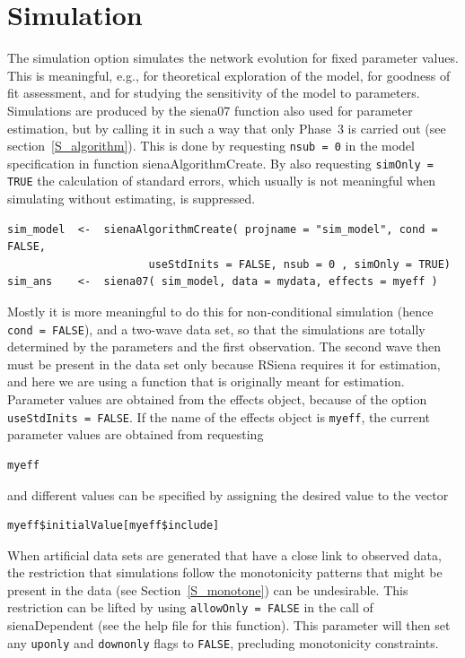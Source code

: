 \documentclass[a4paper,fleqn,11pt]{article}
\newcommand{\+}{\, + \,}
\newcommand{\sfn}[1]{\textsf{#1}}
\newcommand{\RS}{{\sf RSiena }}
\begin{document}
\newpage
\section{Simulation}
\label{S_sim}

The simulation option simulates the network evolution for fixed
parameter values. This is meaningful, e.g., for theoretical
exploration of the model, for goodness of fit assessment,
and for studying the sensitivity of the model to parameters.
Simulations are produced by the \textsf{siena07} function
also used for parameter estimation, but by calling it in
such a way that only Phase~3 is carried out
(see section~\ref{S_algorithm}).
This is done by requesting \texttt{nsub = 0} in
the model specification in function \textsf{sienaAlgorithmCreate}.
By also requesting \texttt{simOnly = TRUE} the calculation
of standard errors, which usually is not meaningful when
simulating without estimating, is suppressed.
\begin{verbatim}
sim_model  <-  sienaAlgorithmCreate( projname = "sim_model", cond = FALSE,
                      useStdInits = FALSE, nsub = 0 , simOnly = TRUE)
sim_ans    <-  siena07( sim_model, data = mydata, effects = myeff )
\end{verbatim}
Mostly it is more meaningful to do this for non-conditional simulation
(hence \texttt{cond = FALSE}), and a two-wave data set,
so that the simulations are totally determined
by the parameters and the first observation.
The second wave then must be present in the data set only
because \RS requires it for estimation,
and here we are using a function that is originally
meant for estimation.
Parameter values are obtained from the effects object,
because of the option \texttt{useStdInits = FALSE}.
If the name of the effects object is \texttt{myeff},
the current parameter values are obtained from requesting
\begin{verbatim}
myeff
\end{verbatim}
and different values can be specified by assigning the
desired value to the vector
\begin{verbatim}
myeff$initialValue[myeff$include]
\end{verbatim}

When artificial data sets are generated that have a close link to observed data,
the restriction that simulations follow the monotonicity patterns that
might be present in the data (see Section~\ref{S_monotone}) can be undesirable.
This restriction can be lifted by using \texttt{allowOnly = FALSE}
in the call of \sfn{sienaDependent} (see the help file for this function).
This parameter will then set any \texttt{uponly} and \texttt{downonly}
flags to \texttt{FALSE}, precluding monotonicity constraints.
\end{document}
